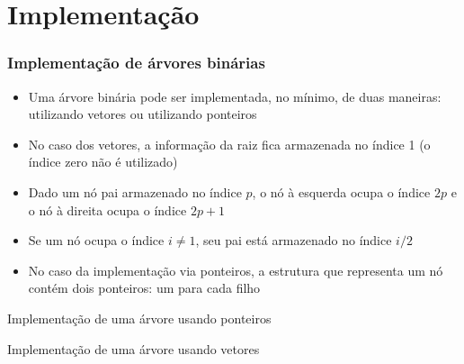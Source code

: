 \section{Implementação}

\begin{frame}
    \frametitle{Implementação de árvores binárias}

    \begin{itemize}
        \item Uma árvore binária pode ser {implementada}, no mínimo, de 
        {duas} maneiras: utilizando vetores ou utilizando ponteiros
        
        \item No caso dos vetores, a informação da raiz fica armazenada no índice 1 (o índice
            zero não é utilizado)
            
        \item Dado um nó pai armazenado no índice $p$, o nó à esquerda ocupa o índice $2p$ e o
            nó à direita ocupa o índice $2p + 1$

        \item Se um nó ocupa o índice $i\neq 1$, seu pai está armazenado no índice $i/2$

        \item No caso da implementação via ponteiros, a estrutura que representa um {nó} contém 
            dois ponteiros: um para cada filho 
    \end{itemize}

\end{frame}

\begin{frame}[fragile]{Implementação de uma árvore usando ponteiros}
\end{frame}

\begin{frame}[fragile]{Implementação de uma árvore usando vetores}
\end{frame}

